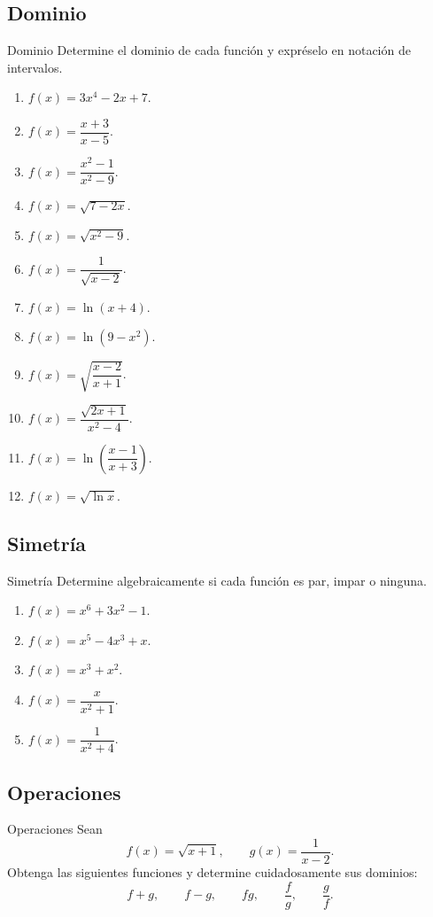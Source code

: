 \documentclass[aspectratio=169,10pt]{beamer}
\begin{document}
\subsection{Dominio}
\begin{frame}{Dominio}
Determine el dominio de cada función y expréselo en notación de intervalos.

\begin{enumerate}
    \item $f(x)=3x^4-2x+7$.
    \item $f(x)=\dfrac{x+3}{x-5}$.
    \item $f(x)=\dfrac{x^2-1}{x^2-9}$.
    \item $f(x)=\sqrt{7-2x}$.
    \item $f(x)=\sqrt{x^2-9}$.
    \item $f(x)=\dfrac{1}{\sqrt{x-2}}$.
    \item $f(x)=\ln(x+4)$.
    \item $f(x)=\ln(9-x^2)$.
    \item $f(x)=\sqrt{\dfrac{x-2}{x+1}}$.
    \item $f(x)=\dfrac{\sqrt{2x+1}}{x^2-4}$.
    \item $f(x)=\ln\left(\dfrac{x-1}{x+3}\right)$.
    \item $f(x)=\sqrt{\ln x}$.
\end{enumerate}
\end{frame}
\subsection{Simetría}
\begin{frame}{Simetría}
Determine algebraicamente si cada función es par, impar o ninguna.

\begin{enumerate}
    \item $f(x)=x^6+3x^2-1$.
    \item $f(x)=x^5-4x^3+x$.
    \item $f(x)=x^3+x^2$.
    \item $f(x)=\dfrac{x}{x^2+1}$.
    \item $f(x)=\dfrac{1}{x^2+4}$.
\end{enumerate}
\end{frame}
\subsection{Operaciones}
\begin{frame}{Operaciones}
Sean
\[
f(x)=\sqrt{x+1},
\qquad
g(x)=\frac{1}{x-2}.
\]
Obtenga las siguientes funciones y determine cuidadosamente sus dominios:
\[
f+g,\qquad f-g,\qquad fg,\qquad\frac fg,\qquad\frac gf.
\]
\end{frame}
\end{document}

